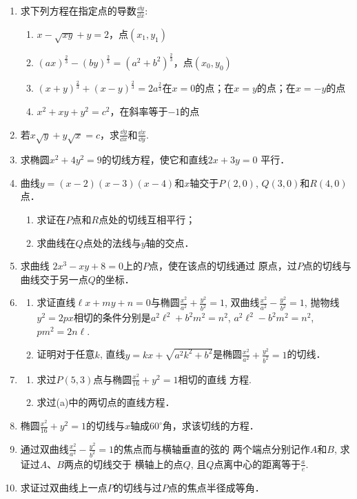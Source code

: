 \begin{ex}
\begin{enumerate}
\item 求下列方程在指定点的导数$\frac{\dd y}{\dd x}$:
\begin{enumerate}
    \item $x-\sqrt{xy}+y=2$，点$(x_1,y_1)$
    \item $(ax)^{\tfrac{2}{3}}-(by)^{\tfrac{2}{3}}=(a^2+b^2)^{\tfrac{2}{3}}$，点$(x_0,y_0)$
    \item $(x+y)^{\tfrac{2}{3}}+(x-y)^{\tfrac{2}{3}}=2a^{\tfrac{2}{3}}$在$x=0$的点；在$x=y$的点；在$x=-y$的点
    \item $x^2+xy+y^2=c^2$，在斜率等于$-1$的点
\end{enumerate}
\item 若$x\sqrt{y}+y\sqrt{x}=c$，求$\frac{\dd y}{\dd x}$和$\frac{\dd x}{\dd y}$.
\item 求椭圆$x^2+4y^2=9$的切线方程，使它和直线$2x+3y=0$
平行．
\item 曲线$y=(x-2)(x-3)(x-4)$和$x$轴交于$P(2, 0)$, $Q(3,0)$和$R(4, 0)$点．
\begin{enumerate}
    \item 求证在$P$点和$R$点处的切线互相平行；
    \item 求曲线在$Q$点处的法线与$y$轴的交点．
\end{enumerate}
\item 求曲线 $2x^3-xy+8=0$上的$P$点，使在该点的切线通过
原点，过$P$点的切线与曲线交于另一点$Q$的坐标．
\item \begin{enumerate}
    \item 求证直线$\ell x +my+n=0$与椭圆$\frac{x^2}{a^2}+\frac{y^2}{b^2}=1$, 双曲线$\frac{x^2}{a^2}-\frac{y^2}{b^2}=1$, 抛物线$y^2=2px$相切的条件分别是$a^2\ell^2+b^2m^2=n^2$, $a^2\ell^2-b^2m^2=n^2$, $pm^2=2n\ell$.
    \item 证明对于任意$k$, 直线$y=kx+\sqrt{a^2k^2+b^2}$是椭圆$\frac{x^2}{a^2}+\frac{y^2}{b^2}=1$的切线．    
\end{enumerate}
\item \begin{enumerate}
    \item 求过$P(5, 3)$点与椭圆$\frac{x^2}{16}+{y^2}=1$相切的直线
    方程.
    \item 求过(a)中的两切点的直线方程．
\end{enumerate}

\item 椭圆$\frac{x^2}{16}+{y^2}=1$的切线与$x$轴成$60^{\circ}$角，求该切线的方程．
\item 通过双曲线$\frac{x^2}{a^2}-\frac{y^2}{b^2}=1$的焦点而与横轴垂直的弦的
两个端点分别记作$A$和$B$, 求证过$A$、$B$两点的切线交于
横轴上的点$Q$, 且$Q$点离中心的距离等于$\frac{a}{e}$.
\item 求证过双曲线上一点$P$的切线与过$P$点的焦点半径成等角．
\end{enumerate}
\end{ex}

